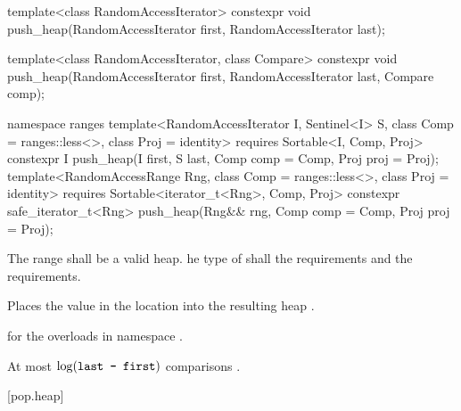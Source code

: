 %
\begin{itemdecl}
template<class RandomAccessIterator>
  constexpr void push_heap(RandomAccessIterator first, RandomAccessIterator last);

template<class RandomAccessIterator, class Compare>
  constexpr void push_heap(RandomAccessIterator first, RandomAccessIterator last,
                           Compare comp);
\end{itemdecl}
\begin{addedblock}
\begin{itemdecl}
namespace ranges {
  template<RandomAccessIterator I, Sentinel<I> S, class Comp = ranges::less<>,
      class Proj = identity>
    requires Sortable<I, Comp, Proj>
    constexpr I
      push_heap(I first, S last, Comp comp = Comp{}, Proj proj = Proj{});
  template<RandomAccessRange Rng, class Comp = ranges::less<>, class Proj = identity>
    requires Sortable<iterator_t<Rng>, Comp, Proj>
    constexpr safe_iterator_t<Rng>
      push_heap(Rng&& rng, Comp comp = Comp{}, Proj proj = Proj{});
}
\end{itemdecl}
\end{addedblock}

\begin{itemdescr}
\pnum
\requires
The range
shall be a valid heap.
he type of
 shall 
the  requirements
and the  requirements.

\pnum
\effects
Places the value in the location
into the resulting heap
.

\begin{addedblock}
\pnum
\returns
{} for the overloads in namespace .
\end{addedblock}

\pnum
\complexity
At most
$\log(\texttt{last - first})$
comparisons .
\end{itemdescr}


[pop.heap]{}


